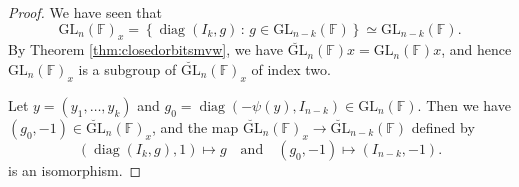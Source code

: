 \documentclass[10pt,a4paper]{amsart}
\newcommand{\C}{\mathbb{F}}
\newcommand{\GL}{{\mathrm{GL}}}
\newcommand{\diag}{\operatorname{diag}}
\renewcommand{\mid}{\,:\,}
\begin{document}
    \begin{proof}
    	We have seen that
    	\begin{equation*}
    		\GL_n(\C)_x=\left\{\diag(I_k,g)\mid g\in\GL_{n-k}(\C)\right\}\simeq\GL_{n-k}(\C).
    	\end{equation*}
    	By Theorem \ref{thm:closedorbitsmvw}, we have $\breve{\GL}_n(\C)x=\GL_{n}(\C)x$, and hence $\GL_n(\C)_x$ is a subgroup of $\breve{\GL}_n(\C)_x$ of index two.
    	
    	Let $y=(y_1,\dots,y_k)$ and $g_0=\diag(-\psi(y),I_{n-k})\in\GL_n(\C)$. Then we have $(g_0,-1)\in\breve{\GL}_n(\C)_x$, and the map $\breve{\GL}_n(\C)_x\to\breve{\GL}_{n-k}(\C)$ defined by
    	\begin{equation*}
    		(\diag(I_k,g),1)\mapsto g\quad\text{and}\quad(g_0,-1)\mapsto(I_{n-k},-1).
    	\end{equation*}
    	is an isomorphism.
    	

\end{proof}
\end{document}
